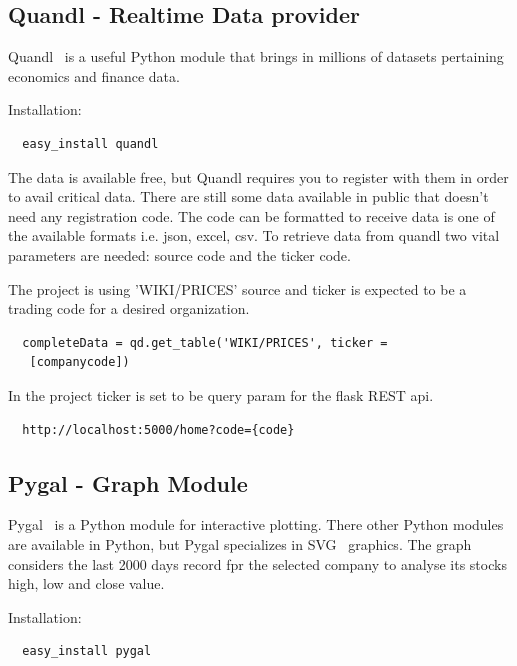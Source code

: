 \subsection{Quandl - Realtime Data provider}
Quandl~\cite{hid-sp18-417-Quandl} is a useful Python module that brings in
millions of datasets pertaining economics and finance data. 

Installation:

\begin{verbatim}
  easy_install quandl
\end{verbatim}
The data is available free, but Quandl requires you to register with them in
order to avail critical data. There are still some data available in public
that doesn’t need any registration code. The code can be formatted to receive
data is one of the available formats i.e. json, excel, csv. To retrieve data
from quandl two vital parameters are needed: source code and the ticker code.

The project is using 'WIKI/PRICES' source and ticker is expected to be a
trading code for a desired organization.
\begin{verbatim}
  completeData = qd.get_table('WIKI/PRICES', ticker =
   [companycode])
\end{verbatim}

In the project ticker is set to be query param for the flask REST api.
\begin{verbatim}
  http://localhost:5000/home?code={code}
\end{verbatim}
\subsection{Pygal - Graph Module}
Pygal~\cite{hid-sp18-417-Pygal} is a Python module for interactive plotting.
There other Python modules are available in Python, but Pygal specializes in
SVG~\cite{hid-sp18-417-SVG} graphics. The graph considers the last 2000 days
record fpr the selected company to analyse its stocks high, low and close
value.

Installation:

\begin{verbatim}
  easy_install pygal
\end{verbatim}

